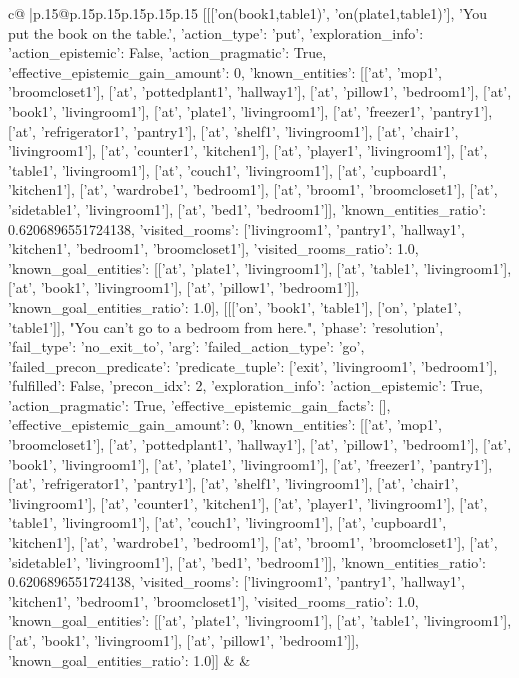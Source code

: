 \documentclass{article}
\begin{document}
{\begin{supertabular}{c@{$\;$}|p{.15\linewidth}@{}p{.15\linewidth}p{.15\linewidth}p{.15\linewidth}p{.15\linewidth}p{.15\linewidth}}
{{{	 [[['on(book1,table1)', 'on(plate1,table1)'], 'You put the book on the table.', {'action_type': 'put', 'exploration_info': {'action_epistemic': False, 'action_pragmatic': True, 'effective_epistemic_gain_amount': 0, 'known_entities': [['at', 'mop1', 'broomcloset1'], ['at', 'pottedplant1', 'hallway1'], ['at', 'pillow1', 'bedroom1'], ['at', 'book1', 'livingroom1'], ['at', 'plate1', 'livingroom1'], ['at', 'freezer1', 'pantry1'], ['at', 'refrigerator1', 'pantry1'], ['at', 'shelf1', 'livingroom1'], ['at', 'chair1', 'livingroom1'], ['at', 'counter1', 'kitchen1'], ['at', 'player1', 'livingroom1'], ['at', 'table1', 'livingroom1'], ['at', 'couch1', 'livingroom1'], ['at', 'cupboard1', 'kitchen1'], ['at', 'wardrobe1', 'bedroom1'], ['at', 'broom1', 'broomcloset1'], ['at', 'sidetable1', 'livingroom1'], ['at', 'bed1', 'bedroom1']], 'known_entities_ratio': 0.6206896551724138, 'visited_rooms': ['livingroom1', 'pantry1', 'hallway1', 'kitchen1', 'bedroom1', 'broomcloset1'], 'visited_rooms_ratio': 1.0, 'known_goal_entities': [['at', 'plate1', 'livingroom1'], ['at', 'table1', 'livingroom1'], ['at', 'book1', 'livingroom1'], ['at', 'pillow1', 'bedroom1']], 'known_goal_entities_ratio': 1.0}}], [[['on', 'book1', 'table1'], ['on', 'plate1', 'table1']], "You can't go to a bedroom from here.", {'phase': 'resolution', 'fail_type': 'no_exit_to', 'arg': {'failed_action_type': 'go', 'failed_precon_predicate': {'predicate_tuple': ['exit', 'livingroom1', 'bedroom1'], 'fulfilled': False, 'precon_idx': 2}}, 'exploration_info': {'action_epistemic': True, 'action_pragmatic': True, 'effective_epistemic_gain_facts': [], 'effective_epistemic_gain_amount': 0, 'known_entities': [['at', 'mop1', 'broomcloset1'], ['at', 'pottedplant1', 'hallway1'], ['at', 'pillow1', 'bedroom1'], ['at', 'book1', 'livingroom1'], ['at', 'plate1', 'livingroom1'], ['at', 'freezer1', 'pantry1'], ['at', 'refrigerator1', 'pantry1'], ['at', 'shelf1', 'livingroom1'], ['at', 'chair1', 'livingroom1'], ['at', 'counter1', 'kitchen1'], ['at', 'player1', 'livingroom1'], ['at', 'table1', 'livingroom1'], ['at', 'couch1', 'livingroom1'], ['at', 'cupboard1', 'kitchen1'], ['at', 'wardrobe1', 'bedroom1'], ['at', 'broom1', 'broomcloset1'], ['at', 'sidetable1', 'livingroom1'], ['at', 'bed1', 'bedroom1']], 'known_entities_ratio': 0.6206896551724138, 'visited_rooms': ['livingroom1', 'pantry1', 'hallway1', 'kitchen1', 'bedroom1', 'broomcloset1'], 'visited_rooms_ratio': 1.0, 'known_goal_entities': [['at', 'plate1', 'livingroom1'], ['at', 'table1', 'livingroom1'], ['at', 'book1', 'livingroom1'], ['at', 'pillow1', 'bedroom1']], 'known_goal_entities_ratio': 1.0}}]] 
	  } 
	   } 
	   } 
	 & & \\ 
 


\end{supertabular}}
\end{document}
